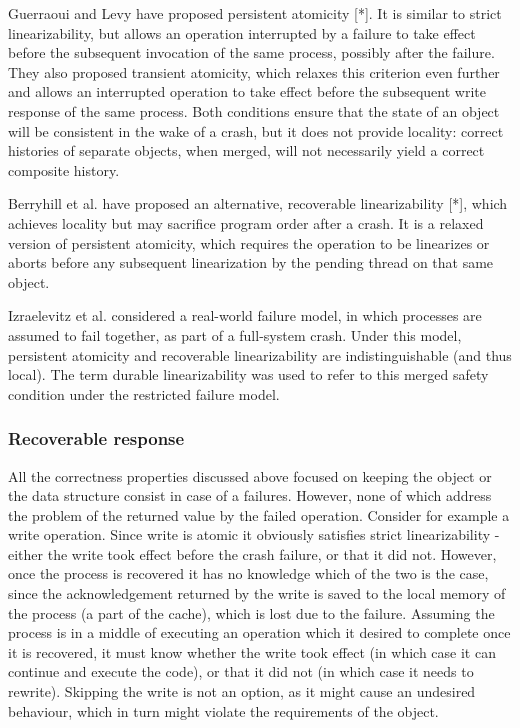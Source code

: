 \documentclass{article}
\begin{document}
Guerraoui and Levy have proposed persistent atomicity [*]. It is similar to strict linearizability, but allows an operation interrupted by a failure to take effect before the subsequent invocation of the same process, possibly after the failure. They also proposed transient atomicity, which relaxes this criterion even further and allows an interrupted operation to take effect before the subsequent write response of the same process. Both conditions ensure that the state of an object will be consistent in the wake of a crash, but it does not provide locality: correct histories of separate objects, when merged, will not necessarily yield a correct composite history.

Berryhill et al. have proposed an alternative, recoverable linearizability [*], which achieves locality but may sacrifice program order after a crash. It is a relaxed version of persistent atomicity, which requires the operation to be linearizes or aborts before any subsequent linearization by the pending thread on that same object.

Izraelevitz et al. considered a real-world failure model, in which processes are assumed to fail together, as part of a full-system crash. Under this model, persistent atomicity and recoverable linearizability are indistinguishable (and thus local). The term durable linearizability was used to refer to this merged safety condition under the restricted failure model.

\subsubsection{Recoverable response}
All the correctness properties discussed above focused on keeping the object or the data structure consist in case of a failures. However, none of which address the problem of the returned value by the failed operation. Consider for example a write operation. Since write is atomic it obviously satisfies strict linearizability - either the write took effect before the crash failure, or that it did not. However, once the process is recovered it has no knowledge which of the two is the case, since the acknowledgement returned by the write is saved to the local memory of the process (a part of the cache), which is lost due to the failure. Assuming the process is in a middle of executing an operation which it desired to complete once it is recovered, it must know whether the write took effect (in which case it can continue and execute the code), or that it did not (in which case it needs to rewrite). Skipping the write is not an option, as it might cause an undesired behaviour, which in turn might violate the requirements of the object.
\end{document}

